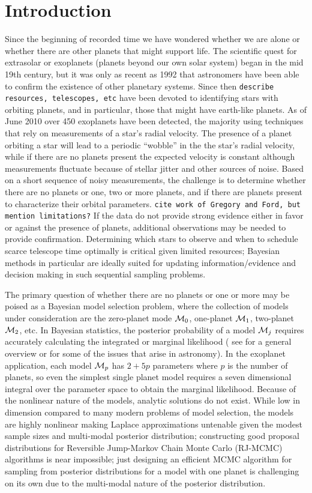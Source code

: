 \section{Introduction}

Since the beginning of recorded time we have wondered whether we are
alone or whether there are other planets that might support life. The
scientific quest for extrasolar or exoplanets (planets beyond our own
solar system) began in the mid 19th century, but it was only as recent
as 1992 that astronomers have been able to confirm the existence of
other planetary systems.  Since then {\tt describe resources,
  telescopes, etc} have been devoted to identifying stars with
orbiting planets, and in particular, those that might have earth-like
planets. As of June 2010 over 450 exoplanets have been detected, the
majority using techniques that rely on measurements of a star's radial
velocity.  The presence of a planet orbiting a star will lead to a
periodic ``wobble'' in the the star's radial velocity, while if there
are no planets present the expected velocity is constant although
measurements fluctuate because of stellar jitter and other sources of
noise.  Based on a short sequence of noisy measurements, the challenge
is to determine whether there are no planets or one, two or more
planets, and if there are planets present to characterize their orbital
parameters.  {\tt cite work of Gregory and Ford, but mention
  limitations?}  If the data do not provide strong evidence either in
favor or against the presence of planets, additional observations may
be needed to provide confirmation.  Determining which stars to observe
and when to schedule scarce telescope time optimally is critical given
limited resources; Bayesian methods in particular are ideally suited
for updating information/evidence and decision
making in such sequential sampling problems.


The primary question of whether there are no planets or one or more
may be poised as a Bayesian model selection problem, where the
collection of models under consideration are the zero-planet mode
${\cal{M}}_0$, one-planet ${\cal{M}}_1$, two-planet ${\cal{M}}_2$, etc.  In Bayesian
statistics, the posterior probability of a model ${\cal{M}}_j$ requires
accurately calculating the integrated or marginal likelihood ( see
\citet{Clyd:Geor:2004} for a general overview or
\citet{Clyd:etal:2005} for some of the issues that arise in
astronomy).  In the exoplanet application, each model ${\cal{M}}_p$ has
$2+5p$ parameters where $p$ is the number of planets, so even the
simplest single planet model requires a seven dimensional integral
over the parameter space to obtain the marginal likelihood.  Because
of the nonlinear nature of the models, analytic solutions do not
exist.  While low in dimension compared to many modern problems of
model selection, the models are highly nonlinear making Laplace
approximations untenable given the modest sample sizes and multi-modal
posterior distribution; constructing good proposal distributions for
Reversible Jump-Markov Chain Monte Carlo (RJ-MCMC) algorithms is near
impossible; just designing an efficient MCMC algorithm for sampling
from posterior distributions for a model with one planet is
challenging on its own due to the multi-modal nature of the posterior
distribution.  


